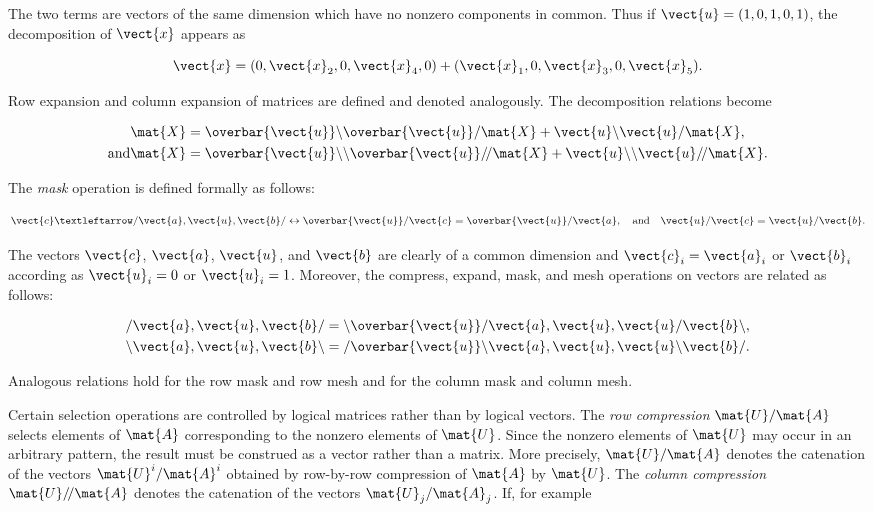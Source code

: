 \noindent The two terms are vectors of the same dimension which have no nonzero components in common. Thus if $\vect{u} = (1, 0, 1, 0, 1)$, the decomposition of $\vect{x}$ appears as

$$
  \vect{x} = (0, \vect{x}_2, 0, \vect{x}_4, 0) + (\vect{x}_1, 0, \vect{x}_3, 0, \vect{x}_5).
$$

\par Row expansion and column expansion of matrices are defined and denoted analogously. The decomposition relations become

\begin{align*}
  & \mat{X}
    = \overbar{\vect{u}}\backslash\overbar{\vect{u}}/\mat{X}
    + \vect{u}\backslash\vect{u}/\mat{X},\\
\text{and}
  & \mat{X}
    = \overbar{\vect{u}}\backslash\backslash\overbar{\vect{u}}/\!/\mat{X}
    + \vect{u}\backslash\backslash\vect{u}/\!/\mat{X}.
\end{align*}

\par The \textit{mask} operation is defined formally as follows:

$$
  \vect{c} ← /\vect{a}, \vect{u}, \vect{b}/
  \leftrightarrow 
  \overbar{\vect{u}}/\vect{c} = \overbar{\vect{u}}/\vect{a},
  \quad\text{and}\quad
  \vect{u}/\vect{c} = \vect{u}/\vect{b}.
$$

\noindent The vectors $\vect{c}$, $\vect{a}$, $\vect{u}$, and $\vect{b}$ are clearly of a common dimension and $\vect{c}_i = \vect{a}_i$ or $\vect{b}_i$ according as $\vect{u}_i = 0$ or $\vect{u}_i = 1$. Moreover, the compress, expand, mask, and mesh operations on vectors are related as follows:

\begin{align*}
  /\vect{a}, \vect{u}, \vect{b}/
    & = \backslash\overbar{\vect{u}}/\vect{a}, \vect{u}, \vect{u}/\vect{b}\backslash, \\
  \backslash\vect{a}, \vect{u}, \vect{b}\backslash
    & = /\overbar{\vect{u}}\backslash\vect{a}, \vect{u}, \vect{u}\backslash\vect{b}/. \\
\end{align*} 

\noindent Analogous relations hold for the row mask and row mesh and for the column mask and column mesh.

\par Certain selection operations are controlled by logical matrices rather than by logical vectors. The \textit{row compression} $\mat{U}/\mat{A}$ selects elements of $\mat{A}$ corresponding to the nonzero elements of $\mat{U}$. Since the nonzero elements of $\mat{U}$ may occur in an arbitrary pattern, the result must be construed as a vector rather than a matrix. More precisely, $\mat{U}/\mat{A}$ denotes the catenation of the vectors $\mat{U}^i/\mat{A}^i$ obtained by row-by-row compression of $\mat{A}$ by $\mat{U}$. The \textit{column compression} $\mat{U}/\!/\mat{A}$ denotes the catenation of the vectors $\mat{U}_j/\mat{A}_j$. If, for example

